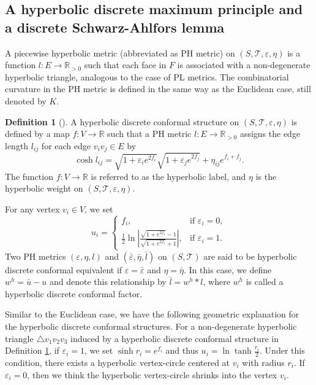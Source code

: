 \documentclass[12pt]{amsart}
\theoremstyle{definition}
\newtheorem{definition}[theorem]{Definition}
\begin{document}
\subsection{A hyperbolic discrete maximum principle and a discrete Schwarz-Ahlfors lemma}\label{Sec: 1.2}

A piecewise hyperbolic metric (abbreviated as PH metric) on $(S, \mathcal{T}, \varepsilon, \eta)$ is a function $l: E \rightarrow \mathbb{R}_{>0}$ such that each face in $F$ is associated with a non-degenerate hyperbolic triangle, analogous to the case of PL metrics.
The combinatorial curvature in the PH metric is defined in the same way as the Euclidean case, still denoted by $K$.

\begin{definition}[\cite{G-T,ZGZLYG}]
\label{Def: IDCP-H}
A hyperbolic discrete conformal structure on $(S, \mathcal{T}, \varepsilon, \eta)$ is defined by a map $f: V\rightarrow \mathbb{R}$ such that
a PH metric $l:E\rightarrow \mathbb{R}_{>0}$ assigns the edge length $l_{ij}$ for each edge $v_iv_j \in E$ by
\begin{equation}\label{Eq: length-H}
\cosh l_{ij}
=\sqrt{1+\varepsilon_ie^{2f_i}}
\sqrt{1+\varepsilon_je^{2f_j}}
+\eta_{ij}e^{f_i+f_j}.
\end{equation}
The function $f: V \to \mathbb{R}$ is referred to as the hyperbolic label, and $\eta$ is the hyperbolic weight on $(S, \mathcal{T}, \varepsilon, \eta)$.
\end{definition}

For any vertex $v_i\in V$, we set
\begin{equation}\label{Eq: u f}
u_i=\begin{cases}
f_i, & \text{if $\varepsilon_i=0$}, \\
\frac{1}{2} \ln \left|\frac{\sqrt{1+e^{2f_i}}-1}{\sqrt{1+e^{2f_i}}+1}\right|, & \text{if $\varepsilon_i=1$.}
\end{cases}
\end{equation}
Two PH metrics $(\varepsilon,\eta, l)$ and $(\bar\varepsilon,\bar\eta, \bar l)$ on $(S, \mathcal{T})$ are said to be hyperbolic discrete conformal equivalent if $\varepsilon=\bar\varepsilon$ and $\eta=\bar\eta$.
In this case, we define $w^h=\bar{u}-u$ and denote this relationship by $\bar l=w^h*l$, where $w^h$ is called a hyperbolic discrete conformal factor.

Similar to the Euclidean case, we have the following geometric explanation for the hyperbolic discrete conformal structures.
For a non-degenerate hyperbolic triangle $\triangle v_1v_2v_3$ induced by a hyperbolic discrete conformal structure in Definition \ref{Def: IDCP-H}, if $\varepsilon_i=1$, we set $\sinh r_i=e^{f_i}$ and thus $u_i=\ln \tanh \frac{r_i}{2}$.
Under this condition, there exists a hyperbolic vertex-circle centered at $v_i$ with radius $r_i$.
If $\varepsilon_i=0$, then we think the hyperbolic vertex-circle shrinks into the vertex $v_i$.
\end{document}
